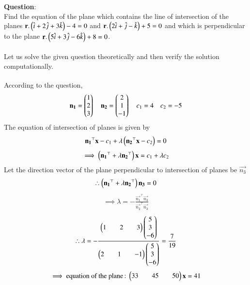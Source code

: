 \documentclass[journal]{IEEEtran}
\begin{document}
\textbf{Question}:\\
Find the equation of the plane which contains the line of intersection of the planes $\mathbf{r}.\left(\hat{i}+2\hat{j}+3\hat{k}\right)-4=0$ and $\mathbf{r}.\left(2\hat{i}+\hat{j}-\hat{k}\right)+5=0$ and which is perpendicular to the plane $\mathbf{r}.\left(5\hat{i}+3\hat{j}-6\hat{k}\right)+8=0$.\\
\solution \\
Let us solve the given question theoretically and then verify the solution computationally.\\
\\
According to the question,\\
\begin{align}
    \mathbf{n_1}=\begin{pmatrix}1\\2\\3\end{pmatrix} \quad \mathbf{n_2}=\begin{pmatrix}2\\1\\-1\end{pmatrix} \quad c_1=4 \quad c_2=-5
\end{align}
The equation of intersection of planes is given by
\begin{align}
    \mathbf{n_1}^{\top}\mathbf{x}-c_1+\lambda\left(\mathbf{n_2}^{\top}\mathbf{x}-c_2\right)=0
\end{align}
\begin{align}
    \implies \left(\mathbf{n_1}^{\top}+\lambda\mathbf{n_2}^{\top}\right)\mathbf{x}=c_1+\lambda c_2
\end{align}
Let the direction vector of the plane perpendicular to intersection of planes be $\vec{n_3}$
\begin{align}
    \therefore \left(\mathbf{n_1}^{\top}+\lambda\mathbf{n_2}^{\top}\right)\mathbf{n_3}=0
\end{align}
\begin{align}
    \implies \lambda=-\frac{\vec{n_1}^{\top}\vec{n_3}}{\vec{n_2}^{\top}\vec{n_3}}
\end{align}
\begin{align}
    \therefore \lambda=-\frac{\begin{pmatrix}1&&2&&3\end{pmatrix}\begin{pmatrix}5\\3\\-6\end{pmatrix}}{\begin{pmatrix}2&&1&&-1\end{pmatrix}\begin{pmatrix}5\\3\\-6\end{pmatrix}}=\frac{7}{19}
\end{align}
\begin{align}
    \implies \text{equation of the plane\,:\;} \begin{pmatrix}33&&45&&50\end{pmatrix}\mathbf{x}=41
\end{align}

\newpage
\vspace*{0.25cm}
\end{document}
